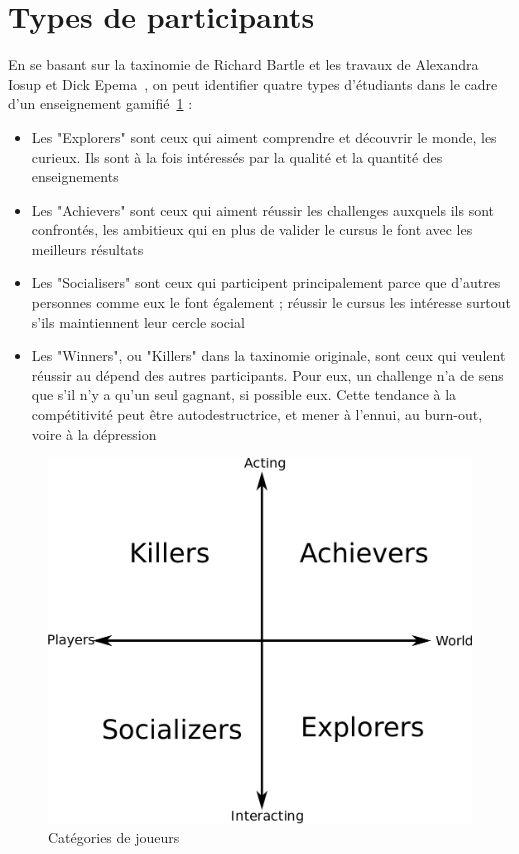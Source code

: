 \section{Types de participants}
En se basant sur la taxinomie de Richard Bartle et les travaux de Alexandra Iosup et Dick Epema~\cite{gamif-educ, gamif-taxonomy}, on peut identifier quatre types d'étudiants dans le cadre d'un enseignement gamifié~\ref{fig:bartle} :
\begin{itemize}
    \item Les "Explorers" sont ceux qui aiment comprendre et découvrir le monde, les curieux. Ils sont à la fois intéressés par la qualité et la quantité des enseignements
    \item Les "Achievers" sont ceux qui aiment réussir les challenges auxquels ils sont confrontés, les ambitieux qui en plus de valider le cursus le font avec les meilleurs résultats
    \item Les "Socialisers" sont ceux qui participent principalement parce que d’autres personnes comme eux le font également ; réussir le cursus les intéresse surtout s’ils maintiennent leur cercle social
    \item Les "Winners", ou "Killers" dans la taxinomie originale, sont ceux qui veulent réussir au dépend des autres participants. Pour eux, un challenge n’a de sens que s’il n’y a qu’un seul gagnant, si possible eux. Cette tendance à la compétitivité peut être autodestructrice, et mener à l’ennui, au burn-out, voire à la dépression
\end{itemize}

\begin{figure}
    \centering
    \includegraphics[width=0.5\linewidth]{Images/Character_theory_chart.png}
    \caption{Catégories de joueurs}
  
    \label{fig:bartle}
\end{figure}


